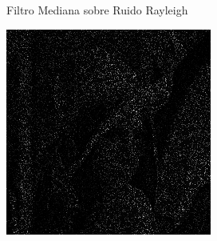 \documentclass{beamer}
\begin{document}
\begin{frame}[fragile]{Filtro Mediana sobre Ruido Rayleigh}
\begin{minipage}{0.25\linewidth}
	\end{minipage}\hfill
	\begin{minipage}{0.25\linewidth}
		\centering
		\includegraphics[width=\linewidth]{../results/lena_rayleigh_xi10}
	\end{minipage}
	

\end{frame}
\end{document}
